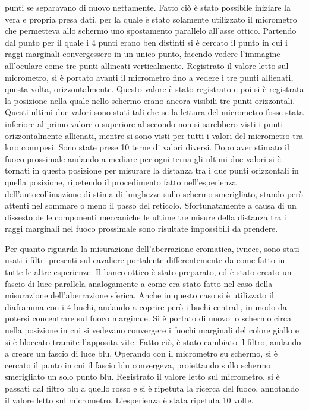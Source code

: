 punti se separavano di nuovo nettamente. Fatto ciò è stato possibile 
iniziare la vera e propria presa dati, per la quale è stato 
solamente utilizzato il micrometro che permetteva allo schermo uno 
spostamento parallelo all'asse ottico. Partendo dal punto per il 
quale i 4 punti erano ben distinti si è cercato il punto in cui i 
raggi marginali convergessero in un unico punto, facendo vedere 
l'immagine all'oculare come tre punti allineati verticalmente. 
Registrato il valore letto sul micrometro, si è portato avanti il 
micrometro fino a vedere i tre punti allienati, questa volta, 
orizzontalmente. Questo valore è stato registrato e poi si è 
registrata la posizione nella quale nello schermo erano ancora 
visibili tre punti orizzontali. Questi ultimi due valori sono stati 
tali che se la lettura del micrometro fosse stata inferiore al primo 
valore o superiore al secondo non si sarebbero visti i punti 
orizzontalmente allienati, mentre si sono visti per tutti i valori 
del micrometro tra loro comrpesi. Sono state prese 10 terne di 
valori diversi. Dopo aver stimato il fuoco prossimale andando a 
mediare per ogni terna gli ultimi due valori si è tornati in questa 
posizione per misurare la distanza tra i due punti orizzontali in 
quella posizione, ripetendo il procedimento fatto nell'esperienza 
dell'autocollimazione di stima di lunghezze sullo schermo 
smerigliato,  stando però attenti nel sommare o meno il passo del 
reticolo. Sfortunatamente a causa di un dissesto delle componenti 
meccaniche le ultime tre misure della distanza tra i raggi marginali 
nel fuoco prossimale sono risultate impossibili da prendere.

Per quanto riguarda la misurazione dell'aberrazione cromatica, 
ivnece, sono stati usati i filtri presenti sul cavaliere portalente 
differentemente da come fatto in tutte le altre esperienze. Il banco 
ottico è stato preparato, ed è stato creato un fascio di luce 
parallela analogamente a come era stato fatto nel caso della 
misurazione dell'aberrazione sferica. Anche in questo caso si è 
utilizzato il diaframma con i 4 buchi, andando a coprire però i 
buchi centrali, in modo da potersi concentrare sul fuoco marginale. 
Si è portato di nuovo lo schermo circa nella posizione in cui si 
vedevano convergere i fuochi marginali del colore giallo e si è 
bloccato tramite l'apposita vite. Fatto ciò, è stato cambiato il 
filtro, andando a creare un fascio di luce blu. Operando con il 
micrometro su schermo, si è cercato il punto in cui il fascio blu 
convergeva, proiettando sullo schermo smerigliato un solo punto blu. 
Registrato il valore letto sul micrometro, si è passati dal filtro 
blu a quello rosso e si è ripetuta la ricerca del fuoco, annotando 
il valore letto sul micrometro. L'esperienza è stata ripetuta 10 
volte.
